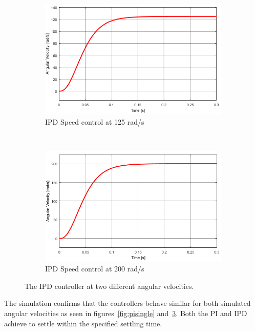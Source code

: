 \begin{figure}[h!]
	\centering
	\begin{subfigure}[b]{0.45\textwidth}
		\includegraphics[width=\textwidth]{graphics/IPD_single125}
		\caption{IPD Speed control at 125 rad/s}
		\label{fig:ipdsingle125}
	\end{subfigure}
	~ %
	\begin{subfigure}[b]{0.45\textwidth}
		\includegraphics[width=\textwidth]{graphics/IPD_single200}
		\caption{IPD Speed control at 200 rad/s}
		\label{fig:ipdsingle200}
	\end{subfigure}
	\caption{The IPD controller at two different angular velocities.}\label{fig:ipdsingle}
\end{figure}

The simulation confirms that the controllers behave similar for both simulated angular velocities as seen in figures~\ref{fig:pisingle} and~\ref{fig:ipdsingle}. Both the PI and IPD achieve to settle within the specified settling time.

